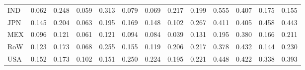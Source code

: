 \begin{table}[htbp]
\begin{tabular}{lcccccccccccc}
  IND & \textcolor[RGB]{244,158,11}{0.062} & \textcolor[RGB]{89,58,166}{0.248} & \textcolor[RGB]{251,162,4}{0.059} & \textcolor[RGB]{66,43,189}{0.313} & \textcolor[RGB]{230,148,26}{0.079} & \textcolor[RGB]{232,150,23}{0.069} & \textcolor[RGB]{110,72,144}{0.217} & \textcolor[RGB]{130,84,125}{0.199} & \textcolor[RGB]{0,0,255}{0.555} & \textcolor[RGB]{25,16,230}{0.407} & \textcolor[RGB]{142,92,113}{0.175} & \textcolor[RGB]{166,107,89}{0.155} \\ 
  JPN & \textcolor[RGB]{178,115,76}{0.145} & \textcolor[RGB]{125,81,130}{0.204} & \textcolor[RGB]{242,157,13}{0.063} & \textcolor[RGB]{136,88,119}{0.195} & \textcolor[RGB]{155,100,100}{0.169} & \textcolor[RGB]{176,114,79}{0.148} & \textcolor[RGB]{208,135,47}{0.102} & \textcolor[RGB]{79,51,176}{0.267} & \textcolor[RGB]{23,15,232}{0.411} & \textcolor[RGB]{30,19,225}{0.405} & \textcolor[RGB]{2,1,253}{0.458} & \textcolor[RGB]{11,7,244}{0.443} \\ 
  MEX & \textcolor[RGB]{212,138,42}{0.096} & \textcolor[RGB]{195,126,60}{0.121} & \textcolor[RGB]{246,160,8}{0.061} & \textcolor[RGB]{193,125,62}{0.121} & \textcolor[RGB]{217,140,38}{0.094} & \textcolor[RGB]{225,146,30}{0.084} & \textcolor[RGB]{253,164,2}{0.039} & \textcolor[RGB]{187,121,68}{0.131} & \textcolor[RGB]{132,85,123}{0.195} & \textcolor[RGB]{42,27,212}{0.380} & \textcolor[RGB]{157,102,98}{0.166} & \textcolor[RGB]{117,76,138}{0.211} \\ 
  RoW & \textcolor[RGB]{189,122,66}{0.123} & \textcolor[RGB]{149,96,106}{0.173} & \textcolor[RGB]{234,151,21}{0.068} & \textcolor[RGB]{83,54,172}{0.255} & \textcolor[RGB]{168,109,87}{0.155} & \textcolor[RGB]{198,128,57}{0.119} & \textcolor[RGB]{123,80,132}{0.206} & \textcolor[RGB]{113,73,142}{0.217} & \textcolor[RGB]{45,29,210}{0.378} & \textcolor[RGB]{17,11,238}{0.432} & \textcolor[RGB]{183,118,72}{0.144} & \textcolor[RGB]{96,62,159}{0.230} \\ 
  USA & \textcolor[RGB]{172,111,83}{0.152} & \textcolor[RGB]{147,95,108}{0.173} & \textcolor[RGB]{206,133,49}{0.102} & \textcolor[RGB]{174,113,81}{0.151} & \textcolor[RGB]{87,56,168}{0.250} & \textcolor[RGB]{102,66,153}{0.224} & \textcolor[RGB]{134,87,121}{0.195} & \textcolor[RGB]{104,67,151}{0.221} & \textcolor[RGB]{6,4,249}{0.448} & \textcolor[RGB]{19,12,236}{0.422} & \textcolor[RGB]{57,37,198}{0.338} & \textcolor[RGB]{36,23,219}{0.393} \\ 
   \hline
\end{tabular}
\end{table}
